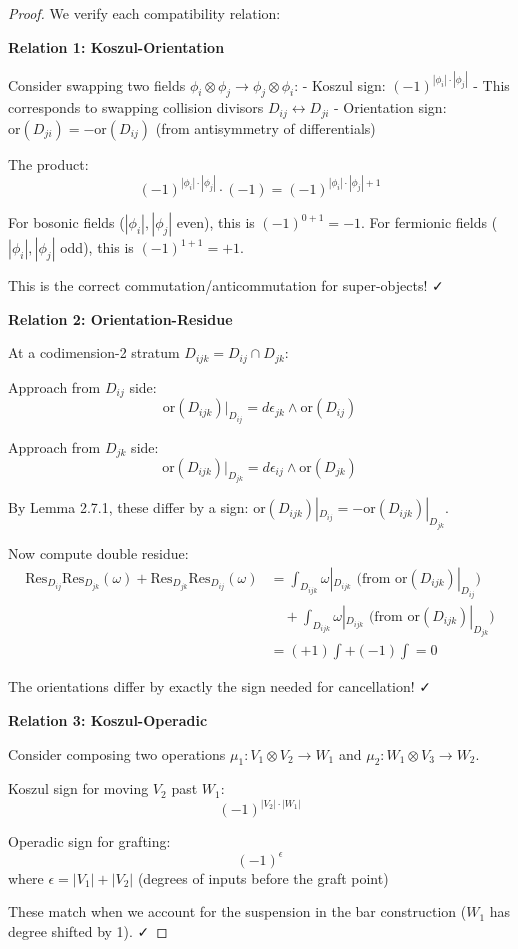 \begin{proof}
We verify each compatibility relation:

\textbf{Relation 1: Koszul-Orientation}

Consider swapping two fields $\phi_i \otimes \phi_j \to \phi_j \otimes \phi_i$:
- Koszul sign: $(-1)^{|\phi_i| \cdot |\phi_j|}$
- This corresponds to swapping collision divisors $D_{ij} \leftrightarrow D_{ji}$
- Orientation sign: $\text{or}(D_{ji}) = -\text{or}(D_{ij})$ (from antisymmetry of differentials)

The product:
$$(-1)^{|\phi_i| \cdot |\phi_j|} \cdot (-1) = (-1)^{|\phi_i| \cdot |\phi_j| + 1}$$

For bosonic fields ($|\phi_i|, |\phi_j|$ even), this is $(-1)^{0+1} = -1$.
For fermionic fields ($|\phi_i|, |\phi_j|$ odd), this is $(-1)^{1+1} = +1$.

This is the correct commutation/anticommutation for super-objects! ✓

\textbf{Relation 2: Orientation-Residue}

At a codimension-2 stratum $D_{ijk} = D_{ij} \cap D_{jk}$:

Approach from $D_{ij}$ side:
$$\text{or}(D_{ijk})|_{D_{ij}} = d\epsilon_{jk} \wedge \text{or}(D_{ij})$$

Approach from $D_{jk}$ side:
$$\text{or}(D_{ijk})|_{D_{jk}} = d\epsilon_{ij} \wedge \text{or}(D_{jk})$$

By Lemma 2.7.1, these differ by a sign: $\text{or}(D_{ijk})|_{D_{ij}} = -\text{or}(D_{ijk})|_{D_{jk}}$.

Now compute double residue:
\begin{align*}
\text{Res}_{D_{ij}} \text{Res}_{D_{jk}}(\omega) + \text{Res}_{D_{jk}} \text{Res}_{D_{ij}}(\omega) &= \int_{D_{ijk}} \omega|_{D_{ijk}} \text{ (from }\text{or}(D_{ijk})|_{D_{ij}}\text{)} \\
&\quad + \int_{D_{ijk}} \omega|_{D_{ijk}} \text{ (from }\text{or}(D_{ijk})|_{D_{jk}}\text{)} \\
&= (+1) \int + (-1) \int = 0
\end{align*}

The orientations differ by exactly the sign needed for cancellation! ✓

\textbf{Relation 3: Koszul-Operadic}

Consider composing two operations $\mu_1: V_1 \otimes V_2 \to W_1$ and $\mu_2: W_1 \otimes V_3 \to W_2$.

Koszul sign for moving $V_2$ past $W_1$:
$$(-1)^{|V_2| \cdot |W_1|}$$

Operadic sign for grafting:
$$(-1)^{\epsilon}$$ where $\epsilon = |V_1| + |V_2|$ (degrees of inputs before the graft point)

These match when we account for the suspension in the bar construction ($W_1$ has degree shifted by 1). ✓
\end{proof}


